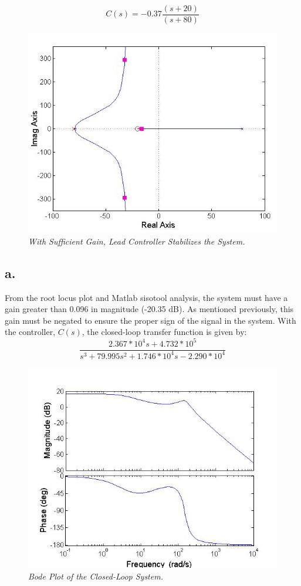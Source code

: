 \documentclass{article}
\theoremstyle{plain}
\theoremstyle{definition}
\theoremstyle{remark}
\begin{document}
$$C(s)= -0.37 \frac{(s+20)}{(s+80)}$$

\begin{figure}[htb]
\begin{center}
\includegraphics[width = 12cm]{FigureB.jpg}
\caption{\emph{With Sufficient Gain, Lead Controller Stabilizes the System.}}
\label{Q2}
\end{center}
\end{figure}

\subsection*{a.}
From the root locus plot and Matlab sisotool analysis, the system must have a gain greater than 0.096 in magnitude (-20.35 dB). As mentioned previously, this gain must be negated to ensure the proper sign of the signal in the system. With the controller, $C(s)$, the closed-loop transfer function is given by:
$$\frac{2.367*10^4 s+ 4.732*10^5}{s^3+ 79.995 s^2+1.746*10^4 s - 2.290*10^4}$$

\begin{figure}[htb]
\begin{center}
\includegraphics[width = 12cm]{ClosedLoopBode2.jpg}
\caption{\emph{Bode Plot of the Closed-Loop System.}}
\label{Q2_a}
\end{center}
\end{figure}
\end{document}
